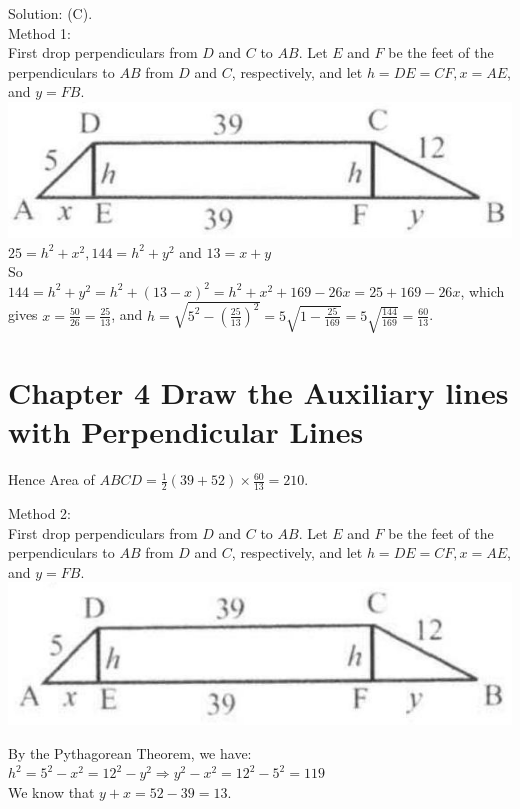 \documentclass[10pt]{article}
\begin{document}
Solution: (C).\\
Method 1:\\
First drop perpendiculars from \(D\) and \(C\) to \(A B\). Let \(E\) and \(F\) be the feet of the perpendiculars to \(A B\) from \(D\) and \(C\), respectively, and let \(h=D E=C F, x=A E\), and \(y=F B\).\\
\includegraphics[max width=\textwidth, center]{2025_04_17_97bc1f7e44d93c271a88g-077}\\
\(25=h^{2}+x^{2}, 144=h^{2}+y^{2}\) and \(13=x+y\)\\
So\\
\(144=h^{2}+y^{2}=h^{2}+(13-x)^{2}=h^{2}+x^{2}+169-26 x=25+169-26 x\), which gives \(x=\frac{50}{26}=\frac{25}{13}\), and \(h=\sqrt{5^{2}-\left(\frac{25}{13}\right)^{2}}=5 \sqrt{1-\frac{25}{169}}=5 \sqrt{\frac{144}{169}}=\frac{60}{13}\).

\section*{Chapter 4 Draw the Auxiliary lines with Perpendicular Lines}
Hence Area of \(A B C D=\frac{1}{2}(39+52) \times \frac{60}{13}=210\).

Method 2:\\
First drop perpendiculars from \(D\) and \(C\) to \(A B\). Let \(E\) and \(F\) be the feet of the perpendiculars to \(A B\) from \(D\) and \(C\), respectively, and let \(h=D E=C F, x=A E\), and \(y=F B\).\\
\includegraphics[max width=\textwidth, center]{2025_04_17_97bc1f7e44d93c271a88g-078(1)}

By the Pythagorean Theorem, we have:\\
\(h^{2}=5^{2}-x^{2}=12^{2}-y^{2} \Rightarrow y^{2}-x^{2}=12^{2}-5^{2}=119\)\\
We know that \(y+x=52-39=13\).
\end{document}
